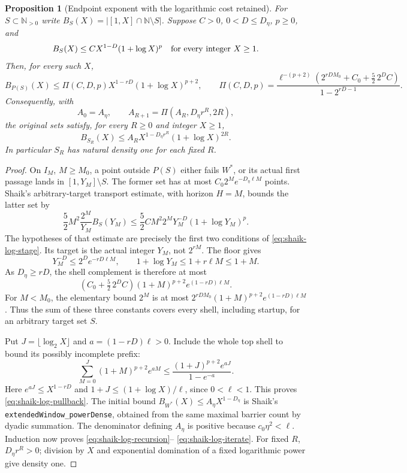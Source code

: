 \documentclass[11pt]{article}
\newtheorem{proposition}{Proposition}
\theoremstyle{remark}\newtheorem{remark}[proposition]{Remark}
\newcommand{\NN}{\mathbb N}
\begin{document}
\begin{proposition}[Endpoint exponent with the logarithmic cost retained]
\label{prop:shaik-log-pullback}
For \(S\subset\NN_{>0}\) write \(B_S(X)=|[1,X]\cap\NN\setminus S|\).
Suppose \(C>0\), \(0<D\le D_\eta\), \(p\ge0\), and
\[
 B_S(X)\le C X^{1-D}(1+\log X)^p
 \quad\hbox{for every integer }X\ge1 .
\]
Then, for every such \(X\),
\begin{equation}\label{eq:shaik-log-pullback}
 B_{P(S)}(X)\le
 \Pi(C,D,p)X^{1-rD}(1+\log X)^{p+2},
 \qquad
 \Pi(C,D,p)=
 \frac{\ell^{-(p+2)}
       \left(2^{rDM_0}+C_0+\frac52\,2^D C\right)}
      {1-2^{rD-1}} .
\end{equation}
Consequently, with
\begin{equation}\label{eq:shaik-log-recursion}
 A_0=A_\eta,\qquad
 A_{R+1}=\Pi(A_R,D_\eta r^R,2R),
\end{equation}
the original sets satisfy, for every \(R\ge0\) and integer \(X\ge1\),
\begin{equation}\label{eq:shaik-log-iterate}
 B_{S_R}(X)\le A_R X^{1-D_\eta r^R}(1+\log X)^{2R}.
\end{equation}
In particular \(S_R\) has natural density one for each fixed \(R\).
\end{proposition}
\begin{proof}
On \(I_M\), \(M\ge M_0\), a point outside \(P(S)\) either fails
\(W^*\), or its actual first passage lands in \([1,Y_M]\setminus S\).
The former set has at most
\(C_0 2^M e^{-D_\eta\ell M}\) points.
Shaik's arbitrary-target transport estimate, with horizon \(H=M\),
bounds the latter set by
\[
 \frac52 M^2\frac{2^M}{Y_M}B_S(Y_M)
 \le \frac52 C M^2 2^M Y_M^{-D}(1+\log Y_M)^p .
\]
The hypotheses of that estimate are precisely the first two
conditions of \eqref{eq:shaik-log-stage}. Its target is the actual
integer \(Y_M\), not \(2^{rM}\). The floor gives
\[
 Y_M^{-D}\le 2^D e^{-rD\ell M},\qquad
 1+\log Y_M\le1+r\ell M\le1+M .
\]
As \(D_\eta\ge rD\), the shell complement is therefore at most
\[
 \left(C_0+\tfrac52\,2^D C\right)
       (1+M)^{p+2}e^{(1-rD)\ell M}.
\]
For \(M<M_0\), the elementary bound \(2^M\) is at most
\(2^{rDM_0}(1+M)^{p+2}e^{(1-rD)\ell M}\).
Thus the sum of these three constants covers every shell,
including startup, for an arbitrary target set \(S\).

Put \(J=\lfloor\log_2X\rfloor\) and \(a=(1-rD)\ell>0\).
Include the whole top shell to bound its possibly incomplete prefix:
\[
 \sum_{M=0}^J(1+M)^{p+2}e^{aM}
 \le\frac{(1+J)^{p+2}e^{aJ}}{1-e^{-a}}.
\]
Here \(e^{aJ}\le X^{1-rD}\) and
\(1+J\le(1+\log X)/\ell\), since \(0<\ell<1\).
This proves \eqref{eq:shaik-log-pullback}.
The initial bound
\(B_{W^*}(X)\le A_\eta X^{1-D_\eta}\) is Shaik's
\texttt{extendedWindow\_powerDense}, obtained from the same maximal
barrier count by dyadic summation. The denominator defining \(A_\eta\)
is positive because \(c_0\eta^2<\ell\).
Induction now proves \eqref{eq:shaik-log-recursion}--%
\eqref{eq:shaik-log-iterate}. For fixed \(R\),
\(D_\eta r^R>0\); division by \(X\) and exponential domination of a
fixed logarithmic power give density one.
\end{proof}
\end{document}
